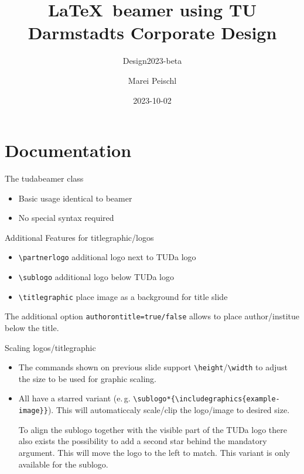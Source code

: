 \documentclass[
	english, %
	design=2023, %
	]{tudabeamer}
\title[TUDaBeamer2023]{\LaTeX~beamer using TU Darmstadts Corporate Design}
\subtitle{Design2023-beta}
\author[M. Peischl]{Marei Peischl}
\institute{pei\TeX}
\date{2023-10-02}
\newcommand*{\code}[1]{\texttt{#1}}
\begin{document}
\maketitle

\tableofcontents

\section{Documentation}
\sectionpage

\begin{frame}{The tudabeamer class}
\begin{itemize}
	\item Basic usage identical to beamer
	\item No special syntax required
\end{itemize}
\end{frame}

\begin{frame}{Additional Features for titlegraphic/logos}
\begin{itemize}
	\item \code{\textbackslash{}partnerlogo} additional logo next to TUDa logo
	\item \code{\textbackslash{}sublogo} additional logo below TUDa logo
	\item \code{\textbackslash{}titlegraphic} place image as a background for title slide
\end{itemize}
	The additional option \code{authorontitle=true/false} allows to place author/institue below the title.
\end{frame}

\begin{frame}{Scaling logos/titlegraphic}
\begin{itemize}
\item The commands shown on previous slide support \code{\textbackslash{}height}/\code{\textbackslash{}width} to adjust the size to be used for graphic scaling.
\item All have a starred variant (e.\,g. \code{\textbackslash{}sublogo*\{\textbackslash{}includegraphics\{example-image\}\}}). This will automaticcaly scale/clip the logo/image to desired size.

To align the sublogo together with the visible part of the TUDa logo there also exists the possibility to add a second star behind the mandatory argument. This will move the logo to the left to match. This variant is only available for the sublogo.
\end{itemize}
\end{frame}
\end{document}
